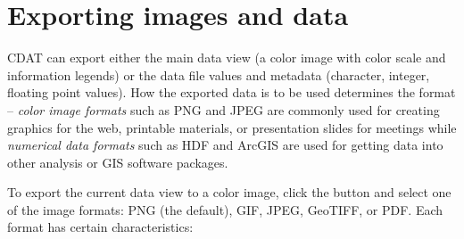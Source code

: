 \section{Exporting images and data}
\label{exporting}

CDAT can export either the main data view (a color image with
color scale and information legends) or the data file values and
metadata (character, integer, floating point values).  How the
exported data is to be used determines the format -- {\em color
image formats} such as PNG and JPEG are commonly used for
creating graphics for the web, printable materials, or
presentation slides for meetings while {\em numerical data
formats} such as HDF and ArcGIS are used for getting data into
other analysis or GIS software packages.

To export the current data view to a color image, click the
 button and select one of the image
formats: PNG (the default), GIF, JPEG, GeoTIFF, or PDF.  Each
format has certain characteristics:
